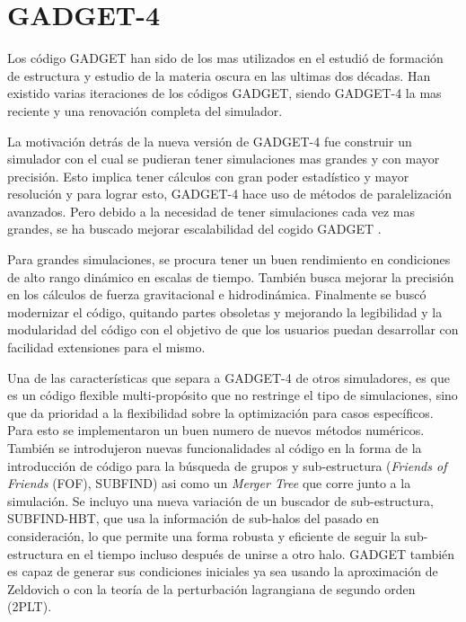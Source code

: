 \section{GADGET-4}

Los código GADGET han sido de los mas utilizados en el estudió de formación de estructura y estudio de la materia oscura en las ultimas dos décadas. Han existido varias iteraciones de los códigos GADGET, siendo GADGET-4 la mas reciente y una renovación completa del simulador. 

La motivación detrás de la nueva versión de GADGET-4 fue construir un simulador con el cual se pudieran tener simulaciones mas grandes y con mayor precisión. Esto implica tener cálculos con gran poder estadístico y mayor resolución y para lograr esto, GADGET-4 hace uso de métodos de paralelización avanzados. Pero debido a la necesidad de tener simulaciones cada vez mas grandes, se ha buscado mejorar escalabilidad del cogido GADGET \cite{2021MNRAS.506.2871S}.

Para grandes simulaciones, se procura tener un buen rendimiento en condiciones de alto rango dinámico en escalas de tiempo. También busca mejorar la precisión en los cálculos de fuerza gravitacional e hidrodinámica. Finalmente se buscó modernizar el código, quitando partes obsoletas y mejorando la legibilidad y la modularidad del código con el objetivo de que los usuarios puedan desarrollar con facilidad extensiones para el mismo. 

 
Una de las características que separa a GADGET-4 de otros simuladores, es que es un código flexible multi-propósito que no restringe el tipo de simulaciones, sino que da prioridad a la flexibilidad  sobre la optimización para casos específicos. Para esto se implementaron un buen numero de nuevos métodos numéricos. También se introdujeron nuevas funcionalidades al código en la forma de la introducción de código para la búsqueda de grupos y sub-estructura (\textit{Friends of Friends} (FOF), SUBFIND) asi como un \textit{Merger Tree} que corre junto a la simulación. Se incluyo una nueva variación de un buscador de sub-estructura, SUBFIND-HBT, que usa la información de sub-halos del pasado en consideración, lo que permite una forma robusta y eficiente de seguir la sub-estructura en el tiempo incluso después de unirse a otro halo. GADGET también es capaz de generar sus condiciones iniciales ya sea usando la aproximación de Zeldovich o con la teoría de la perturbación lagrangiana de segundo orden (2PLT)\cite{2021MNRAS.506.2871S}.


